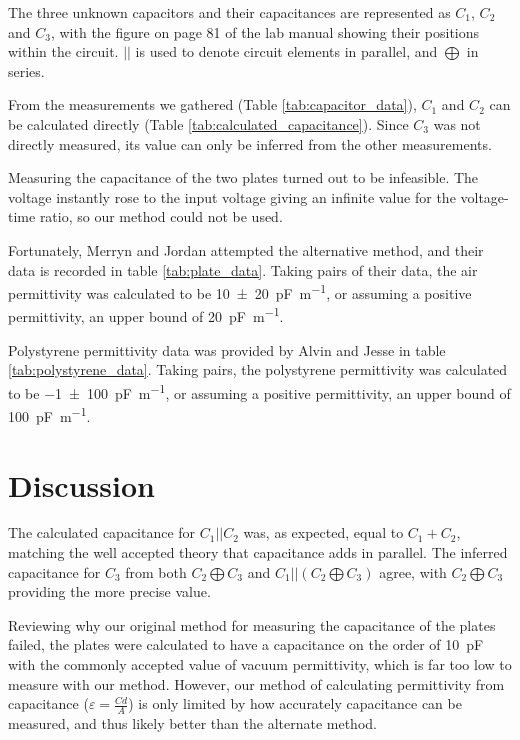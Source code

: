 \documentclass[a4paper]{scrartcl}
\begin{document}
The three unknown capacitors and their capacitances are represented as \(C_1\), \(C_2\) and \(C_3\), with the figure on page 81 of the lab manual showing their positions within the circuit. \(||\) is used to denote circuit elements in parallel, and \(\bigoplus\) in series.

From the measurements we gathered (Table \ref{tab:capacitor_data}), \(C_1\) and \(C_2\) can be calculated directly (Table \ref{tab:calculated_capacitance}). Since \(C_3\) was not directly measured, its value can only be inferred from the other measurements.

Measuring the capacitance of the two plates turned out to be infeasible. The voltage instantly rose to the input voltage giving an infinite value for the voltage-time ratio, so our method could not be used.

Fortunately, Merryn and Jordan attempted the alternative method, and their data is recorded in table \ref{tab:plate_data}. Taking pairs of their data, the air permittivity was calculated to be \SI{10 \pm 20}{\pico\farad\per\metre}, or assuming a positive permittivity, an upper bound of \SI{20}{\pico\farad\per\meter}.

Polystyrene permittivity data was provided by Alvin and Jesse in table \ref{tab:polystyrene_data}. Taking pairs, the polystyrene permittivity was calculated to be \SI{-1 \pm 100}{\pico\farad\per\metre}, or assuming a positive permittivity, an upper bound of \SI{100}{\pico\farad\per\meter}.

\section{Discussion}
The calculated capacitance for \(C_1 || C_2\) was, as expected, equal to \(C_1 + C_2\), matching the well accepted theory that capacitance adds in parallel. The inferred capacitance for \(C_3\) from both \(C_2 \bigoplus C_3\) and \(C_1 || (C_2 \bigoplus C_3)\) agree, with \(C_2 \bigoplus C_3\) providing the more precise value.

Reviewing why our original method for measuring the capacitance of the plates failed, the plates were calculated to have a capacitance on the order of \SI{10}{\pico\farad} with the commonly accepted value of vacuum permittivity, which is far too low to measure with our method. However, our method of calculating permittivity from capacitance (\(\varepsilon = \frac{C d}{A}\)) is only limited by how accurately capacitance can be measured, and thus likely better than the alternate method.
\end{document}
